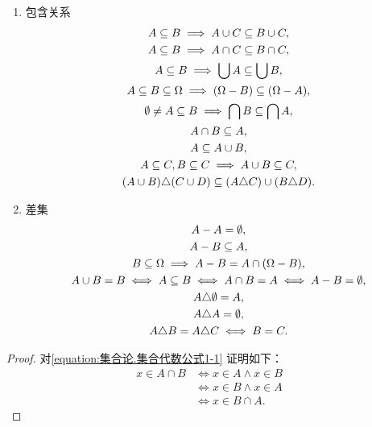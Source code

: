 \begin{property}
\begin{enumerate}
\item 包含关系
\begin{gather}
	A \subseteq B \implies A \cup C \subseteq B \cup C, \label{equation:集合论.集合代数公式6-1} \\
	A \subseteq B \implies A \cap C \subseteq B \cap C, \label{equation:集合论.集合代数公式6-2} \\
	A \subseteq B \implies \bigcup A \subseteq \bigcup B, \label{equation:集合论.集合代数公式6-3} \\
	A \subseteq B \subseteq \Omega \implies (\Omega - B) \subseteq (\Omega - A), \label{equation:集合论.集合代数公式6-4} \\
	\emptyset \neq A \subseteq B \implies \bigcap B \subseteq \bigcap A, \label{equation:集合论.集合代数公式6-5} \\
	A \cap B \subseteq A, \\
	A \subseteq A \cup B, \label{equation:集合论.集合代数公式6-7} \\
	A \subseteq C, B \subseteq C \implies A \cup B \subseteq C, \label{equation:集合论.集合代数公式6-8} \\
	(A \cup B) \triangle (C \cup D) \subseteq (A \triangle C) \cup (B \triangle D).
\end{gather}

\item 差集
\begin{gather}
	A - A = \emptyset, \\
	A - B \subseteq A, \\
	B \subseteq \Omega
	\implies
	A - B = A \cap (\Omega - B), \\
	A \cup B = B
		\iff A \subseteq B
		\iff A \cap B = A
		\iff A - B = \emptyset, \label{equation:集合论.集合代数公式7-3} \\
	A \triangle \emptyset = A, \\
	A \triangle A = \emptyset, \\
	A \triangle B = A \triangle C
		\iff B = C.
\end{gather}
\end{enumerate}
\begin{proof}
对\cref{equation:集合论.集合代数公式1-1} 证明如下：
\begin{align*}
	x \in A \cap B
	&\iff x \in A \land x \in B \\
	&\iff x \in B \land x \in A \\
	&\iff x \in B \cap A.
\end{align*}


\end{proof}
\end{property}
